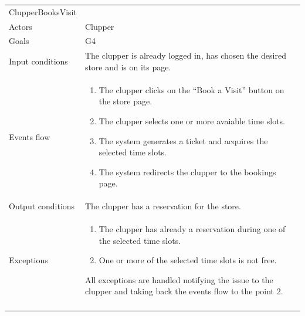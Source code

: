 \clearpage
\begin{longtable}[]{@{}
  >{\raggedright\arraybackslash}p{}
  >{\raggedright\arraybackslash}p{}@{}}
\toprule
ClupperBooksVisit & \\ \addlinespace
\midrule
\endhead
Actors & Clupper \\ \addlinespace
Goals & G4 \\ \addlinespace
Input conditions & The clupper is already logged in, has chosen the desired store and is on its page. \\ \addlinespace
Events flow & \begin{enumerate}\vspace{-1.35\baselineskip}
    \item The clupper clicks on the ``Book a Visit'' button on the store page.
    \item The clupper selects one or more avaiable time slots.
    \item The system generates a ticket and acquires the selected time slots.
    \item The system redirects the clupper to the bookings page. 
\vspace{-1.0\baselineskip}\end{enumerate} \\ \addlinespace
Output conditions & The clupper has a reservation for the store. \\ \addlinespace
Exceptions & \begin{enumerate}\vspace{-1.35\baselineskip}
    \item The clupper has already a reservation during one of the selected time slots.
    \item One or more of the selected time slots is not free.
\end{enumerate} All exceptions are handled notifying the issue to the clupper and taking back the events flow to the point 2. \\ \addlinespace
\bottomrule
\end{longtable}

